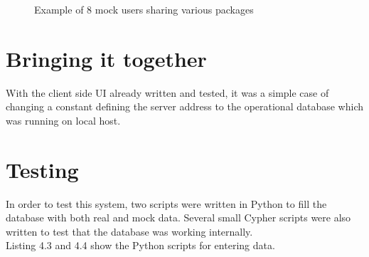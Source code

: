 \documentclass{l4proj}
\begin{document}
\begin{figure}
\caption{Example of 8 mock users sharing various packages}
\end{figure}

\section{Bringing it together}
With the client side UI already written and tested, it was a simple case of changing a constant defining the server address to the operational database which was running on local host.

\section{Testing}
In order to test this system, two scripts were written in Python to fill the database with both real and mock data. Several small Cypher scripts were also written to test that the database was working internally.\\
Listing 4.3 and 4.4 show the Python scripts for entering data.\\
\begin{figure}

\end{figure}
\begin{figure}

\end{figure}
 
\end{document}
